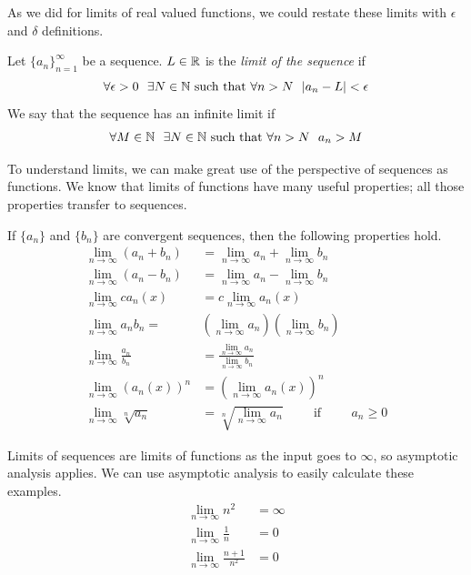 \documentclass[fleqn,letterpaper]{report}
\begin{document}
As we did for limits of real valued functions, 
we could restate these limits with $\epsilon$ and $\delta$
definitions.

\begin{defn}
Let $\{a_n\}_{n=1}^\infty$ be a sequence. $L \in
\mathbb{R}$ is the \emph{limit of the sequence} if 
\begin{equation*}
\forall \epsilon > 0 \ \ \exists N \in \mathbb{N} \text{ such that }
\forall n > N \ \ |a_n - L| < \epsilon
\end{equation*}
We say that the sequence has an infinite limit if
\begin{equation*}
\forall M \in \mathbb{N} \ \ \exists N \in \mathbb{N} \text{ such that }
\forall n > N \ \ a_n > M
\end{equation*}
\end{defn}

To understand limits, we can make great use of the perspective
of sequences as functions. We know that limits of functions
have many useful properties; all those properties transfer to
sequences. 

\begin{prop}If $\{a_n\}$ and $\{b_n\}$ are convergent
sequences, then the following properties hold.
\begin{align*}
\lim_{n \rightarrow \infty} (a_n + b_n) & = \lim_{n
\rightarrow \infty} a_n + \lim_{n \rightarrow \infty} b_n \\
\lim_{n \rightarrow \infty} (a_n-b_n) & = \lim_{n \rightarrow
\infty} a_n - \lim_{n \rightarrow \infty} b_n \\
\lim_{n \rightarrow \infty} ca_n(x) & = c \lim_{n \rightarrow
\infty} a_n(x) \\
\lim_{n \rightarrow \infty} a_n b_n = & \left( \lim_{n \rightarrow
\infty} a_n \right) \left( \lim_{n \rightarrow \infty} b_n
\right)\\
\lim_{n \rightarrow \infty} \frac{a_n}{b_n} & = \frac{\lim_{n
\rightarrow \infty} a_n}{\lim_{n \rightarrow \infty} b_n} \\
\lim_{n \rightarrow \infty} (a_n(x))^n & = (\lim_{n
\rightarrow \infty} a_n(x))^n \\
\lim_{n \rightarrow \infty} \sqrt[n]{a_n} & = \sqrt[n]{\lim_{n
\rightarrow \infty} a_n} \hspace{1cm} \text{if} \hspace{1cm}
a_n \geq 0
\end{align*}
\end{prop}

\begin{example}Limits of sequences are limits of 
functions as the input goes to $\infty$, so asymptotic
analysis applies. We can use asymptotic analysis to easily
calculate these examples.
\begin{align*}
\lim_{n \rightarrow \infty} n^2 & = \infty \\
\lim_{n \rightarrow \infty} \frac{1}{n} & = 0 \\
\lim_{n \rightarrow \infty} \frac{n+1}{n^2} & = 0 
\end{align*}
\end{example}
\end{document}
